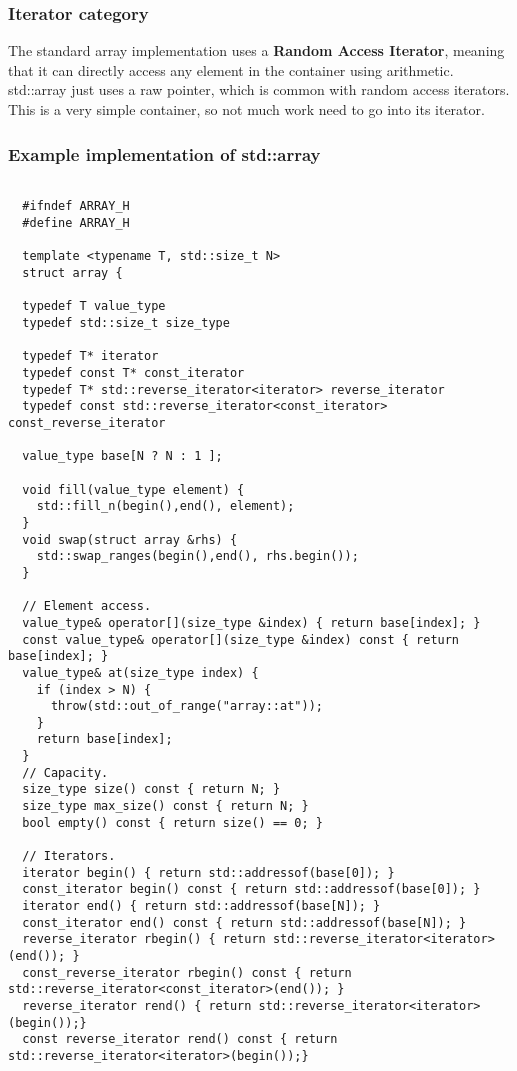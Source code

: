 \documentclass{report}
\begin{document}
  \subsubsection*{Iterator category}
  The standard array implementation uses a \textbf{Random Access Iterator}, meaning that it can directly access any element in the container using arithmetic. std::array just uses a raw pointer, which is common with random access iterators. This is a very simple container, so not much work need to go into its iterator.
  \subsubsection*{Example implementation of std::array}
  \begin{verbatim}
  
  #ifndef ARRAY_H
  #define ARRAY_H
  
  template <typename T, std::size_t N> 
  struct array {

  typedef T value_type
  typedef std::size_t size_type

  typedef T* iterator
  typedef const T* const_iterator
  typedef T* std::reverse_iterator<iterator> reverse_iterator
  typedef const std::reverse_iterator<const_iterator> const_reverse_iterator

  value_type base[N ? N : 1 ];
  
  void fill(value_type element) {
    std::fill_n(begin(),end(), element);
  }
  void swap(struct array &rhs) {
    std::swap_ranges(begin(),end(), rhs.begin());
  }

  // Element access.
  value_type& operator[](size_type &index) { return base[index]; }
  const value_type& operator[](size_type &index) const { return base[index]; }
  value_type& at(size_type index) { 
    if (index > N) {
      throw(std::out_of_range("array::at"));
    }
    return base[index];
  }
  // Capacity.
  size_type size() const { return N; }
  size_type max_size() const { return N; }
  bool empty() const { return size() == 0; }

  // Iterators.
  iterator begin() { return std::addressof(base[0]); }
  const_iterator begin() const { return std::addressof(base[0]); }
  iterator end() { return std::addressof(base[N]); }
  const_iterator end() const { return std::addressof(base[N]); }
  reverse_iterator rbegin() { return std::reverse_iterator<iterator>(end()); }
  const_reverse_iterator rbegin() const { return std::reverse_iterator<const_iterator>(end()); }
  reverse_iterator rend() { return std::reverse_iterator<iterator>(begin());}
  const reverse_iterator rend() const { return std::reverse_iterator<iterator>(begin());}


\end{verbatim}
\end{document}
